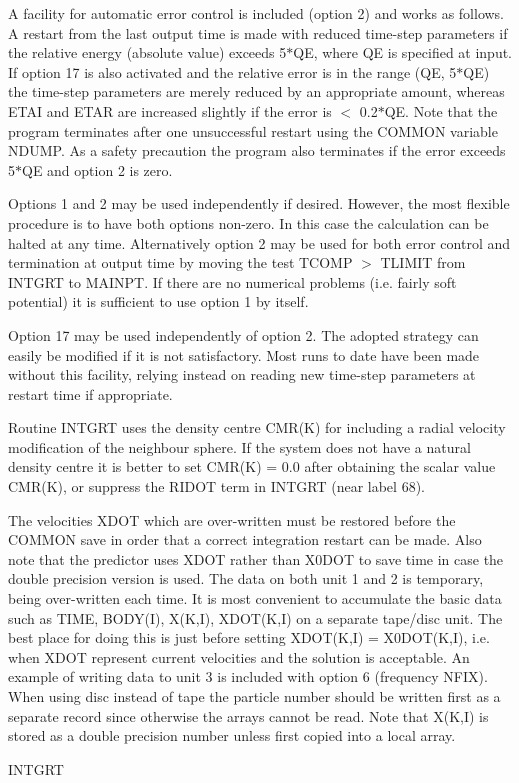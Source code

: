  A facility for automatic error control is included (option 2) and works as
 follows.  A restart from the last output time is made with reduced time-step
 parameters if the relative energy (absolute value) exceeds 5$\ast$QE, where QE
 is
 specified at input.  If option 17 is also activated and the relative error is
 in the range (QE, 5$\ast$QE) the time-step parameters are merely reduced by an
 appropriate amount, whereas ETAI and ETAR are increased slightly if the error
 is $<$ 0.2$\ast$QE.  Note that the program terminates after one unsuccessful
 restart
 using the COMMON variable NDUMP.  As a safety precaution the program also
 terminates if the error exceeds 5$\ast$QE and option 2 is zero.

     Options 1 and 2 may be used independently if desired.  However, the most
 flexible procedure is to have both options non-zero.  In this case the
 calculation can be halted at any time.  Alternatively option 2 may be used
 for both error control and termination at output time by moving the test
 TCOMP $>$ TLIMIT from INTGRT to MAINPT.  If there are no
 numerical problems (i.e. fairly soft potential) it is sufficient to use
 option 1 by itself.

 Option 17 may be used independently of option 2.  The adopted strategy can
 easily be modified if it is not satisfactory.  Most runs to date have been
 made without this facility, relying instead on reading new time-step
 parameters at restart time if appropriate.

 Routine INTGRT uses the density centre CMR(K) for including a radial
 velocity modification of the neighbour sphere.  If the system does not
 have a natural density centre it is better to set CMR(K) = 0.0 after
 obtaining the scalar value CMR(K), or suppress the RIDOT term in
 INTGRT (near label 68).

 The velocities XDOT which are over-written must be restored before the
 COMMON save in order that a correct integration restart can be made.  Also note
 that the predictor uses XDOT rather than X0DOT to save time in case the double
 precision version is used.  The data on both unit 1 and 2 is
 temporary, being over-written each time.  It is most convenient to accumulate
 the basic data such as TIME, BODY(I), X(K,I), XDOT(K,I) on a separate tape/disc
 unit.  The best place for doing this is just before setting
 XDOT(K,I) = X0DOT(K,I), i.e. when XDOT represent current velocities and the
 solution is acceptable.  An example of writing data to unit 3 is included
 with option 6 (frequency NFIX).  When using disc instead of tape the particle
 number should be
 written first as a separate record since otherwise the arrays cannot be
 read.  Note that X(K,I) is stored as a double precision number
 unless first copied into a local array.
\bigskip
\bigskip
\centerline {INTGRT}
\bigskip

